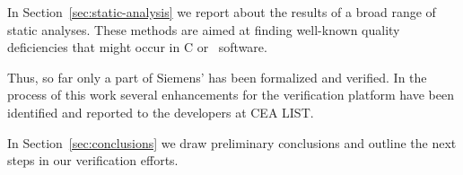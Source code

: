 In Section~\ref{sec:static-analysis} we report about the results of a broad range
of static analyses. 
These methods are aimed at finding well-known quality deficiencies that
might occur in C or \CC\ software.

Thus, so far only a part of Siemens' \bitwalker has been formalized and verified.
In the process of this work several enhancements for the \framac verification platform
have been identified and reported to the developers at {CEA LIST}.

In Section~\ref{sec:conclusions} we draw preliminary conclusions
and outline the next steps in our verification efforts.

